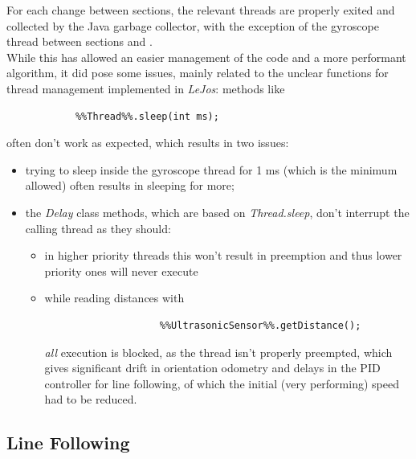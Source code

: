 \documentclass[a4paper,11pt,oneside]{book}
\newcommand{\RNum}[1]{\uppercase\expandafter{\romannumeral #1\relax}}
\begin{document}
			For each change between sections, the relevant threads are properly exited and collected by the Java garbage collector, with the exception of the gyroscope thread between sections \RNum{2} and \RNum{3}.\\
			
			While this has allowed an easier management of the code and a more performant algorithm, it did pose some issues, mainly related to the unclear functions for thread management implemented in \textit{LeJos}: methods like
			\begin{lstlisting}
			%%Thread%%.sleep(int ms);
			\end{lstlisting}
			often don't work as expected, which results in two issues:
			\begin{itemize}
				\item trying to sleep inside the gyroscope thread for 1 ms (which is the minimum allowed) often results in sleeping for more;
				\item the \textit{Delay} class methods, which are based on \textit{Thread.sleep}, don't interrupt the calling thread as they should:
					\begin{itemize}
					\item in higher priority threads this won't result in preemption and thus lower priority ones will never execute
					\item while reading distances with 
					\begin{lstlisting}
					%%UltrasonicSensor%%.getDistance();
					\end{lstlisting}
					\emph{all} execution is blocked, as the thread isn't properly preempted, which gives significant drift in orientation odometry and delays in the PID controller for line following, of which the initial (very performing) speed had to be reduced.
				\end{itemize}
					
			
			\end{itemize}
			
			
			\subsection {Line Following}
			
\end{document}
